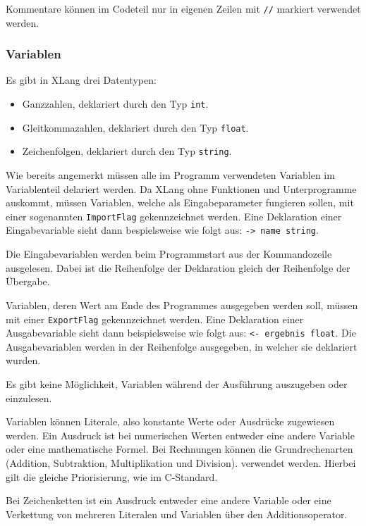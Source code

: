 \documentclass[a4paper]{article}
\begin{document}
Kommentare können im Codeteil nur in eigenen Zeilen mit \texttt{//} markiert verwendet werden.

\subsubsection{Variablen}

Es gibt in XLang drei Datentypen:

\begin{itemize}
	\item Ganzzahlen, deklariert durch den Typ \texttt{int}.
	\item Gleitkommazahlen, deklariert durch den Typ \texttt{float}.
	\item Zeichenfolgen, deklariert durch den Typ \texttt{string}.
\end{itemize}

Wie bereits angemerkt müssen alle im Programm verwendeten Variablen im Variablenteil delariert
werden.
Da XLang ohne Funktionen und Unterprogramme auskommt, müssen Variablen, welche als Eingabeparameter
fungieren sollen, mit einer sogenannten \texttt{ImportFlag} gekennzeichnet werden. Eine Deklaration
einer Eingabevariable sieht dann bespielsweise wie folgt aus: \texttt{-> name string}.

Die Eingabevariablen werden beim Programmstart aus der Kommandozeile ausgelesen.
Dabei ist die Reihenfolge der Deklaration gleich der Reihenfolge der Übergabe.

Variablen, deren Wert am Ende des Programmes ausgegeben werden soll, müssen mit einer
\texttt{ExportFlag} gekennzeichnet werden. Eine Deklaration einer Ausgabevariable sieht dann
beispielsweise wie folgt aus: \texttt{<- ergebnis float}.
Die Ausgabevariablen werden in der Reihenfolge ausgegeben, in welcher sie deklariert wurden.

Es gibt keine Möglichkeit, Variablen während der Ausführung auszugeben oder einzulesen.

Variablen können Literale, also konstante Werte oder Ausdrücke zugewiesen werden.
Ein Ausdruck ist bei numerischen Werten entweder eine andere Variable oder eine mathematische
Formel. Bei Rechnungen können die Grundrechenarten (Addition, Subtraktion, Multiplikation und
Division). verwendet werden. Hierbei gilt die gleiche Priorisierung, wie im C-Standard.

Bei Zeichenketten ist ein Ausdruck entweder eine andere Variable oder eine Verkettung von mehreren
Literalen und Variablen über den Additionsoperator.
\end{document}
